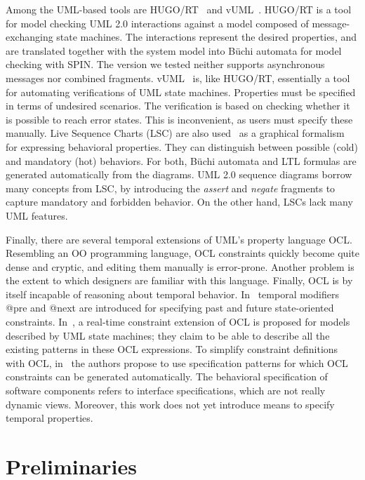 \documentclass[letter]{llncs}
\begin{document}
Among the UML-based tools are
HUGO/RT~\cite{Knapp:2006:MCU:1762828.1762836} and
vUML~\cite{Lilius99vuml:a}.  HUGO/RT is a tool for model checking
UML 2.0 interactions against a model composed of message-exchanging
state machines. The interactions represent the desired properties,
and are translated together with the system model into B\"uchi automata
for model checking with SPIN.  The version we tested neither supports
asynchronous messages nor combined fragments.  vUML~\cite{Lilius99vuml:a}
is, like HUGO/RT, essentially a tool for automating verifications
of UML state machines.  Properties must be specified in terms of
undesired scenarios.  The verification is based on checking whether
it is possible to reach error states. This is inconvenient, as users
must specify these manually.  Live Sequence Charts (LSC) are also
used~\cite{Kugler:2005:TLS:2140653.2140692,MVPSA} as a graphical
formalism for expressing behavioral properties.  They can distinguish
between possible (cold) and mandatory (hot) behaviors.  For both, B\"uchi
automata and LTL formulas are generated automatically from the diagrams.
UML 2.0 sequence diagrams borrow many concepts from LSC, by introducing
the \emph{assert} and \emph{negate} fragments to capture mandatory and
forbidden behavior. On the other hand, LSCs lack many UML features.

Finally, there are several temporal extensions of UML's property
language OCL.  Resembling an OO programming language, OCL constraints
quickly become quite dense and cryptic, and editing them manually is
error-prone. Another problem is the extent to which designers are
familiar with this language.  Finally, OCL is by itself incapable
of reasoning about temporal behavior.  In~\cite{Ziemann02anextension}
temporal modifiers @pre and @next are introduced for specifying past and
future state-oriented constraints.  In~\cite{Flake03formalsemantics},
a real-time constraint extension of OCL is proposed for models described
by UML state machines; they claim to be able to describe all the existing
patterns in these OCL expressions.  To simplify constraint definitions
with OCL, in~\cite{Ackermann:2006:LOS:2135315.2135339} the authors propose
to use specification patterns for which OCL constraints can be generated
automatically.  The behavioral specification of software components refers
to interface specifications, which are not really dynamic views. Moreover,
this work does not yet introduce means to specify temporal properties.
\vspace{-7 pt}

\section{Preliminaries}
\label{sec:Preliminaries}
\vspace{-7 pt}
\end{document}
